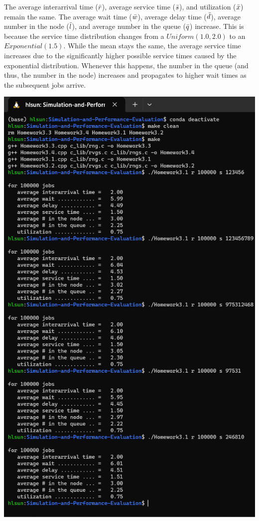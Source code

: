 \noindent The average interarrival time ($\Bar{r}$), average service time ($\Bar{s}$), and utilization ($\Bar{x}$) remain the same. The average wait time ($\Bar{w}$), average delay time ($\Bar{d}$), average number in the node ($\Bar{l}$), and average number in the queue ($\Bar{q}$) increase. This is because the service time distribution changes from a $Uniform(1.0,2.0)$ to an $Exponential(1.5)$. While the mean stays the same, the average service time increases due to the significantly higher possible service times caused by the exponential distribution. Whenever this happens, the number in the queue (and thus, the number in the node) increases and propagates to higher wait times as the subsequent jobs arrive.
\begin{center}
    \includegraphics[scale=1]{Sections/Q1/H3_1.png}
\end{center}
